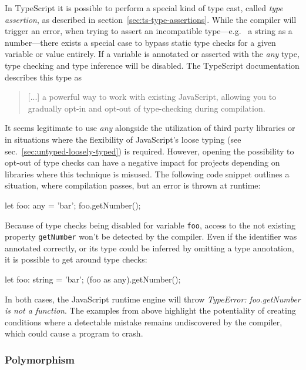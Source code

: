 In TypeScript it is possible to perform a special kind of type cast, called \emph{type assertion}, as described in section~\ref{sec:ts-type-assertions}. While the compiler will trigger an error, when trying to assert an incompatible type---e.g.\  a string as a number---there exists a special case to bypass static type checks for a given variable or value entirely. If a variable is annotated or asserted with the \emph{any} type, type checking and type inference will be disabled. The TypeScript documentation describes this type as 
\begin{quote}
   [...] a powerful way to work with existing JavaScript, allowing you to gradually opt-in and opt-out of type-checking during compilation.~\cite{TypeScriptHandbook:BasicTypes}
\end{quote}
It seems legitimate to use \emph{any} alongside the utilization of third party libraries or in situations where the flexibility of JavaScript's loose typing (see sec.~\ref{sec:untyped-loosely-typed}) is required. However, opening the possibility to opt-out of type checks can have a negative impact for projects depending on libraries where this technique is misused. The following code snippet outlines a situation, where compilation passes, but an error is thrown at runtime:
\begin{JsCode}[numbers=none]
let foo: any = 'bar';
foo.getNumber();
\end{JsCode}
Because of type checks being disabled for variable \texttt{foo}, access to the not existing property \texttt{getNumber} won't be detected by the compiler. Even if the identifier was annotated correctly, or its type could be inferred by omitting a type annotation, it is possible to get around type checks:
\begin{JsCode}[numbers=none]
let foo: string = 'bar';
(foo as any).getNumber();
\end{JsCode}
In both cases, the JavaScript runtime engine will throw \emph{TypeError: foo.getNumber is not a function}. The examples from above highlight the potentiality of creating conditions where a detectable mistake remains undiscovered by the compiler, which could cause a program to crash.

\subsubsection{Polymorphism}


